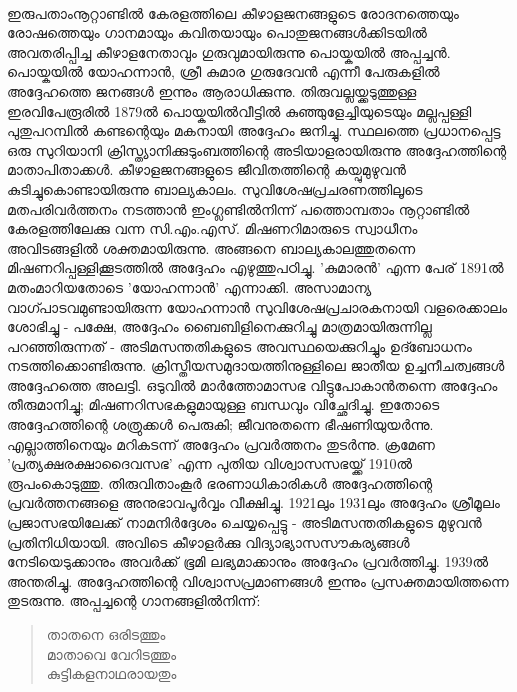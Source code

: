 \label{ch2box7} %
\begin{tcolorbox}[%
  breakable, %
  arc=0mm, 
  left=1pt, right = 1pt, 
  boxrule=0mm,
  colback = {blue!10}, %
] 

\paragraph{}

ഇരുപതാംനൂറ്റാണ്ടിൽ കേരളത്തിലെ കീഴാളജനങ്ങളുടെ രോദനത്തെയും രോഷത്തെയും ഗാനമായും കവിതയായും പൊതുജനങ്ങൾക്കിടയിൽ അവതരിപ്പിച്ച കീഴാളനേതാവും ഗുരുവുമായിരുന്നു പൊയ്കയിൽ അപ്പച്ചൻ. പൊയ്കയിൽ യോഹന്നാൻ, ശ്രീ കുമാര ഗുരുദേവൻ എന്നീ പേരുകളിൽ അദ്ദേഹത്തെ ജനങ്ങൾ ഇന്നും ആരാധിക്കുന്നു. തിരുവല്ലയ്ക്കടുത്തുള്ള ഇരവിപേരൂരിൽ 1879ൽ പൊയ്കയിൽവീട്ടിൽ കുഞ്ഞുളേച്ചിയുടെയും മല്ലപ്പള്ളി പുതുപറമ്പിൽ കണ്ടന്റെയും മകനായി അദ്ദേഹം ജനിച്ചു. സ്ഥലത്തെ പ്രധാനപ്പെട്ട ഒരു സുറിയാനി ക്രിസ്ത്യാനിക്കുടുംബത്തിന്റെ അടിയാളരായിരുന്നു അദ്ദേഹത്തിന്റെ മാതാപിതാക്കൾ. കീഴാളജനങ്ങളുടെ ജീവിതത്തിന്റെ കയ്പുമുഴുവൻ കുടിച്ചുകൊണ്ടായിരുന്നു ബാല്യകാലം. സുവിശേഷപ്രചരണത്തിലൂടെ മതപരിവർത്തനം നടത്താൻ ഇംഗ്ലണ്ടിൽനിന്ന് പത്തൊമ്പതാം നൂറ്റാണ്ടിൽ കേരളത്തിലേക്കു വന്ന സി.എം.എസ്. മിഷണറിമാരുടെ സ്വാധീനം അവിടങ്ങളിൽ ശക്തമായിരുന്നു. അങ്ങനെ ബാല്യകാലത്തുതന്നെ മിഷണറിപ്പള്ളിക്കൂടത്തിൽ അദ്ദേഹം എഴുത്തുപഠിച്ചു. 'കുമാരൻ' എന്ന പേര് 1891ൽ മതംമാറിയതോടെ 'യോഹന്നാൻ' എന്നാക്കി. അസാമാന്യ വാഗ്പാടവമുണ്ടായിരുന്ന യോഹന്നാൻ സുവിശേഷപ്രചാരകനായി വളരെക്കാലം ശോഭിച്ചു - പക്ഷേ, അദ്ദേഹം ബൈബിളിനെക്കുറിച്ചു മാത്രമായിരുന്നില്ല പറഞ്ഞിരുന്നത് - അടിമസന്തതികളുടെ അവസ്ഥയെക്കുറിച്ചും ഉദ്ബോധനം നടത്തിക്കൊണ്ടിരുന്നു. ക്രിസ്തീയസമുദായത്തിനുള്ളിലെ ജാതീയ ഉച്ചനീചത്വങ്ങൾ അദ്ദേഹത്തെ അലട്ടി. ഒടുവിൽ മാർത്തോമാസഭ വിട്ടുപോകാൻതന്നെ അദ്ദേഹം തീരുമാനിച്ചു; മിഷണറിസഭകളുമായുള്ള ബന്ധവും വിച്ഛേദിച്ചു. ഇതോടെ അദ്ദേഹത്തിന്റെ ശത്രുക്കൾ പെരുകി; ജീവനുതന്നെ ഭീഷണിയുയർന്നു. എല്ലാത്തിനെയും മറികടന്ന് അദ്ദേഹം പ്രവർത്തനം തുടർന്നു. ക്രമേണ 'പ്രത്യക്ഷരക്ഷാദൈവസഭ' എന്ന പുതിയ വിശ്വാസസഭയ്ക്ക് 1910ൽ രൂപംകൊടുത്തു. തിരുവിതാംകൂർ ഭരണാധികാരികൾ അദ്ദേഹത്തിന്റെ പ്രവർത്തനങ്ങളെ അനുഭാവപൂർവ്വം വീക്ഷിച്ചു. 1921ലും 1931ലും അദ്ദേഹം ശ്രീമൂലം പ്രജാസഭയിലേക്ക് നാമനിർദ്ദേശം ചെയ്യപ്പെട്ടു - അടിമസന്തതികളുടെ മുഴുവൻ പ്രതിനിധിയായി. അവിടെ കീഴാളർക്കു വിദ്യാഭ്യാസസൗകര്യങ്ങൾ നേടിയെടുക്കാനും അവർക്ക് ഭൂമി ലഭ്യമാക്കാനും അദ്ദേഹം പ്രവർത്തിച്ചു. 1939ൽ അന്തരിച്ചു. അദ്ദേഹത്തിന്റെ വിശ്വാസപ്രമാണങ്ങൾ ഇന്നും പ്രസക്തമായിത്തന്നെ തുടരുന്നു. അപ്പച്ചന്റെ ഗാനങ്ങളിൽനിന്ന്:
\begin{quote}{}
താതനെ ഒരിടത്തും\\
മാതാവെ വേറിടത്തും\\
കുട്ടികളനാഥരായതും\\

\end{quote}
\end{tcolorbox}
